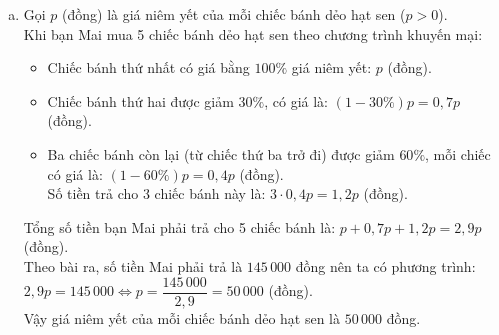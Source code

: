\begin{bt}
{\begin{enumerate}[a)]
    Vậy giá nhập của mỗi chiếc bánh dẻo hạt sen là $34\,800$ đồng và bánh chay mè đen là $45\,000$ đồng.
    \item Gọi $p$ (đồng) là giá niêm yết của mỗi chiếc bánh dẻo hạt sen ($p > 0$).\\
    Khi bạn Mai mua 5 chiếc bánh dẻo hạt sen theo chương trình khuyến mại:
    \begin{itemize}
        \item Chiếc bánh thứ nhất có giá bằng $100\%$ giá niêm yết: $p$ (đồng).
        \item Chiếc bánh thứ hai được giảm $30\%$, có giá là: $(1 - 30\%)p = 0{,}7p$ (đồng).
        \item Ba chiếc bánh còn lại (từ chiếc thứ ba trở đi) được giảm $60\%$, mỗi chiếc có giá là: $(1 - 60\%)p = 0{,}4p$ (đồng).\\
        Số tiền trả cho 3 chiếc bánh này là: $3 \cdot 0{,}4p = 1{,}2p$ (đồng).
    \end{itemize}
    Tổng số tiền bạn Mai phải trả cho 5 chiếc bánh là:
    $p + 0{,}7p + 1{,}2p = 2{,}9p$ (đồng).\\
    Theo bài ra, số tiền Mai phải trả là $145\,000$ đồng nên ta có phương trình:
    $2{,}9p = 145\,000 \Leftrightarrow p = \dfrac{145\,000}{2{,}9} = 50\,000$ (đồng).\\
    Vậy giá niêm yết của mỗi chiếc bánh dẻo hạt sen là $50\,000$ đồng.
\end{enumerate}
}
\end{bt}

